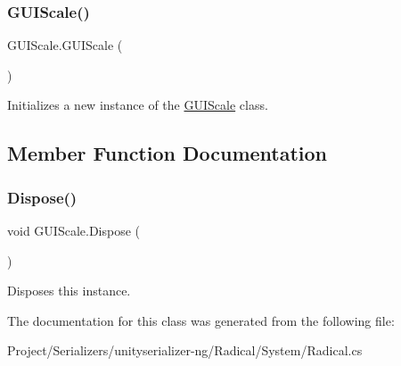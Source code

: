 \subsubsection{\texorpdfstring{G\+U\+I\+Scale()}{GUIScale()}}
{\footnotesize\ttfamily G\+U\+I\+Scale.\+G\+U\+I\+Scale (\begin{DoxyParamCaption}{ }\end{DoxyParamCaption})\hspace{0.3cm}{\ttfamily [inline]}}



Initializes a new instance of the \hyperlink{class_g_u_i_scale}{G\+U\+I\+Scale} class. 



\subsection{Member Function Documentation}
\mbox{\label{class_g_u_i_scale_aa00049ce6abb6b97382a00260f32952d}} 
\subsubsection{\texorpdfstring{Dispose()}{Dispose()}}
{\footnotesize\ttfamily void G\+U\+I\+Scale.\+Dispose (\begin{DoxyParamCaption}{ }\end{DoxyParamCaption})\hspace{0.3cm}{\ttfamily [inline]}}



Disposes this instance. 



The documentation for this class was generated from the following file\+:\begin{DoxyCompactItemize}
\item 
Project/\+Serializers/unityserializer-\/ng/\+Radical/\+System/Radical.\+cs\end{DoxyCompactItemize}
